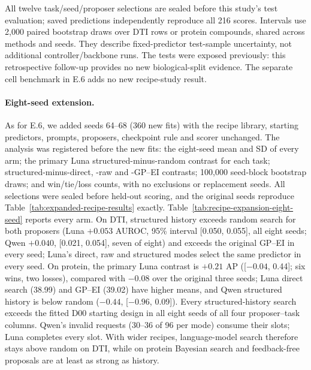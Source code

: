 All twelve task/seed/proposer selections are sealed before this study's test evaluation; saved predictions independently reproduce all 216 scores. Intervals use 2,000 paired bootstrap draws over DTI rows or protein compounds, shared across methods and seeds. They describe fixed-predictor test-sample uncertainty, not additional controller/backbone runs. The tests were exposed previously: this retrospective follow-up provides no new biological-split evidence. The separate cell benchmark in E.6 adds no new recipe-study result.

\paragraph{Eight-seed extension.} As for E.6, we added seeds 64--68 (360 new fits) with the recipe library, starting predictors, prompts, proposers, checkpoint rule and scorer unchanged. The analysis was registered before the new fits: the eight-seed mean and SD of every arm; the primary Luna structured-minus-random contrast for each task; structured-minus-direct, -raw and -GP--EI contrasts; 100,000 seed-block bootstrap draws; and win/tie/loss counts, with no exclusions or replacement seeds. All selections were sealed before held-out scoring, and the original seeds reproduce Table~\ref{tab:expanded-recipe-results} exactly. Table~\ref{tab:recipe-expansion-eight-seed} reports every arm. On DTI, structured history exceeds random search for both proposers (Luna $+0.053$ AUROC, 95\% interval [0.050, 0.055], all eight seeds; Qwen $+0.040$, [0.021, 0.054], seven of eight) and exceeds the original GP--EI in every seed; Luna's direct, raw and structured modes select the same predictor in every seed. On protein, the primary Luna contrast is $+0.21$ AP ([$-0.04$, 0.44]; six wins, two losses), compared with $-0.08$ over the original three seeds; Luna direct search (38.99) and GP--EI (39.02) have higher means, and Qwen structured history is below random ($-0.44$, [$-0.96$, 0.09]). Every structured-history search exceeds the fitted D00 starting design in all eight seeds of all four proposer--task columns. Qwen's invalid requests (30--36 of 96 per mode) consume their slots; Luna completes every slot. With wider recipes, language-model search therefore stays above random on DTI, while on protein Bayesian search and feedback-free proposals are at least as strong as history.



